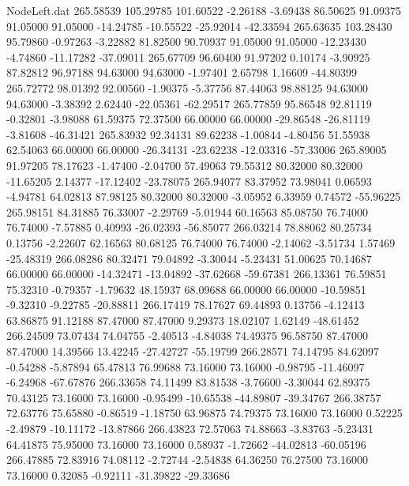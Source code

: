 \begin{filecontents}{NodeLeft.dat}
 265.58539  105.29785  101.60522    -2.26188   -3.69438   86.50625   91.09375   91.05000   91.05000  -14.24785  -10.55522  -25.92014  -42.33594
 265.63635  103.28430   95.79860    -0.97263   -3.22882   81.82500   90.70937   91.05000   91.05000  -12.23430   -4.74860  -11.17282  -37.09011
 265.67709   96.60400   91.97202     0.10174   -3.90925   87.82812   96.97188   94.63000   94.63000   -1.97401    2.65798    1.16609  -44.80399
 265.72772   98.01392   92.00560    -1.90375   -5.37756   87.44063   98.88125   94.63000   94.63000   -3.38392    2.62440  -22.05361  -62.29517
 265.77859   95.86548   92.81119    -0.32801   -3.98088   61.59375   72.37500   66.00000   66.00000  -29.86548  -26.81119   -3.81608  -46.31421
 265.83932   92.34131   89.62238    -1.00844   -4.80456   51.55938   62.54063   66.00000   66.00000  -26.34131  -23.62238  -12.03316  -57.33006
 265.89005   91.97205   78.17623    -1.47400   -2.04700   57.49063   79.55312   80.32000   80.32000  -11.65205    2.14377  -17.12402  -23.78075
 265.94077   83.37952   73.98041     0.06593   -4.94781   64.02813   87.98125   80.32000   80.32000   -3.05952    6.33959    0.74572  -55.96225
 265.98151   84.31885   76.33007    -2.29769   -5.01944   60.16563   85.08750   76.74000   76.74000   -7.57885    0.40993  -26.02393  -56.85077
 266.03214   78.88062   80.25734     0.13756   -2.22607   62.16563   80.68125   76.74000   76.74000   -2.14062   -3.51734    1.57469  -25.48319
 266.08286   80.32471   79.04892    -3.30044   -5.23431   51.00625   70.14687   66.00000   66.00000  -14.32471  -13.04892  -37.62668  -59.67381
 266.13361   76.59851   75.32310    -0.79357   -1.79632   48.15937   68.09688   66.00000   66.00000  -10.59851   -9.32310   -9.22785  -20.88811
 266.17419   78.17627   69.44893     0.13756   -4.12413   63.86875   91.12188   87.47000   87.47000    9.29373   18.02107    1.62149  -48.61452
 266.24509   73.07434   74.04755    -2.40513   -4.84038   74.49375   96.58750   87.47000   87.47000   14.39566   13.42245  -27.42727  -55.19799
 266.28571   74.14795   84.62097    -0.54288   -5.87894   65.47813   76.99688   73.16000   73.16000   -0.98795  -11.46097   -6.24968  -67.67876
 266.33658   74.11499   83.81538    -3.76600   -3.30044   62.89375   70.43125   73.16000   73.16000   -0.95499  -10.65538  -44.89807  -39.34767
 266.38757   72.63776   75.65880    -0.86519   -1.18750   63.96875   74.79375   73.16000   73.16000    0.52225   -2.49879  -10.11172  -13.87866
 266.43823   72.57063   74.88663    -3.83763   -5.23431   64.41875   75.95000   73.16000   73.16000    0.58937   -1.72662  -44.02813  -60.05196
 266.47885   72.83916   74.08112    -2.72744   -2.54838   64.36250   76.27500   73.16000   73.16000    0.32085   -0.92111  -31.39822  -29.33686

\end{filecontents}
